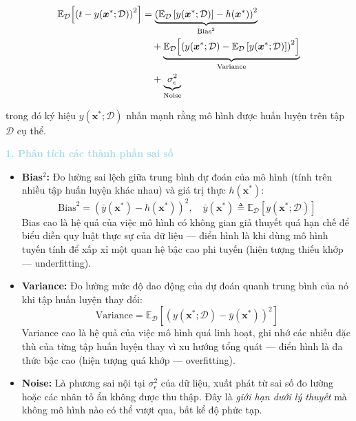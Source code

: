 \begin{align}
\mathbb{E}_{\mathcal{D}}\!\left[\left(t - y(\boldsymbol{x}^*;\mathcal{D})\right)^2\right] 
&= \underbrace{\left(\mathbb{E}_{\mathcal{D}}\left[y(\boldsymbol{x}^*;\mathcal{D})\right] 
   - h(\boldsymbol{x}^*)\right)^2}_{\mathrm{Bias}^2} \notag \\
&\quad + \underbrace{\mathbb{E}_{\mathcal{D}}\!\left[\left(y(\boldsymbol{x}^*;\mathcal{D}) 
   - \mathbb{E}_{\mathcal{D}}\left[y(\boldsymbol{x}^*;\mathcal{D})\right]\right)^2
   \right]}_{\mathrm{Variance}} \notag \\
&\quad + \underbrace{\sigma_{\epsilon}^2}_{\mathrm{Noise}}
\label{eq:bias_variance}
\end{align}

trong đó ký hiệu $y(\boldsymbol{x}^*;\mathcal{D})$ nhấn mạnh rằng mô hình được 
huấn luyện trên tập $\mathcal{D}$ cụ thể.

\vspace{0.5em}
\textcolor{lightblue}{\textbf{1. Phân tích các thành phần sai số}}
\vspace{0.5em}

\begin{itemize} [labelsep=10pt, leftmargin=2cm]
    \item \textbf{Bias$^2$:} Đo lường sai lệch 
    giữa trung bình dự đoán của mô hình (tính trên nhiều tập huấn luyện khác nhau) 
    và giá trị thực $h(\boldsymbol{x}^*)$:
    $$\mathrm{Bias}^2 = \left(\bar{y}(\boldsymbol{x}^*) - h(\boldsymbol{x}^*)\right)^2, 
      \quad \bar{y}(\boldsymbol{x}^*) \triangleq 
      \mathbb{E}_{\mathcal{D}}\left[y(\boldsymbol{x}^*;\mathcal{D})\right]$$
    Bias cao là hệ quả của việc mô hình có không gian giả thuyết 
    quá hạn chế để biểu diễn quy luật thực sự của dữ liệu --- điển hình là khi 
    dùng mô hình tuyến tính để xấp xỉ một quan hệ bậc cao phi tuyến 
    (hiện tượng thiếu khớp --- underfitting).

    \item \textbf{Variance:} Đo lường mức độ dao động của 
    dự đoán quanh trung bình của nó khi tập huấn luyện thay đổi:
    $$\mathrm{Variance} = \mathbb{E}_{\mathcal{D}}\!\left[\left(y(\boldsymbol{x}^*;\mathcal{D}) 
      - \bar{y}(\boldsymbol{x}^*)\right)^2\right]$$
    Variance cao là hệ quả của việc mô hình quá linh hoạt, ghi nhớ các nhiễu đặc 
    thù của từng tập huấn luyện thay vì xu hướng tổng quát --- điển hình là đa thức 
    bậc cao (hiện tượng quá khớp --- overfitting).

    \item \textbf{Noise:} Là phương sai nội tại 
    $\sigma_\epsilon^2$ của dữ liệu, xuất phát từ sai số đo lường hoặc các nhân tố 
    ẩn không được thu thập. Đây là \textit{giới hạn dưới lý thuyết} 
    mà không mô hình nào có thể vượt qua, bất kể độ phức tạp.
\end{itemize}

